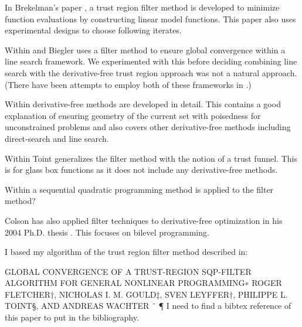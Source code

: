\documentclass{article} %
\begin{document}
In Brekelman's paper \cite{DUMMY:Brekelman}, a trust region filter method is developed to minimize function evaluations by constructing linear model functions. This paper also uses experimental designs to choose following iterates.


Within \cite{DUMMY:linesearch_global} and \cite{DUMMY:linesearch_local} Biegler uses a filter method to ensure global convergence within a line search framework. We experimented with this before deciding combining line search with the derivative-free trust region approach was not a natural approach. (There have been attempts to employ both of these frameworks in \cite{DUMMY:CombineTrustAndLine}.)



Within  \cite{DUMMY:intro_book} derivative-free methods are developed in detail. This contains a good explanation of ensuring geometry of the current set with poisedness for unconstrained problems and also covers other derivative-free methods including direct-search and line search.


Within \cite{DUMMY:trust_funnel_dfo} Toint generalizes the filter method with the notion of a trust funnel. This is for glass box functions as it does not include any derivative-free methods.


Within \cite{DUMMY:sqp_filter} a sequential quadratic programming method is applied to the filter method?


Colson has also applied filter techniques to derivative-free optimization in his 2004 Ph.D. thesis \cite{Colson2004}. This focuses on bilevel programming.


I based my algorithm of the trust region filter method described in:

GLOBAL CONVERGENCE OF A TRUST-REGION SQP-FILTER
ALGORITHM FOR GENERAL NONLINEAR PROGRAMMING∗
ROGER FLETCHER†, NICHOLAS I. M. GOULD‡, SVEN LEYFFER†,
PHILIPPE L. TOINT§, AND ANDREAS WACHTER ¨ ¶
I need to find a bibtex reference of this paper to put in the bibliography.



\end{document}
